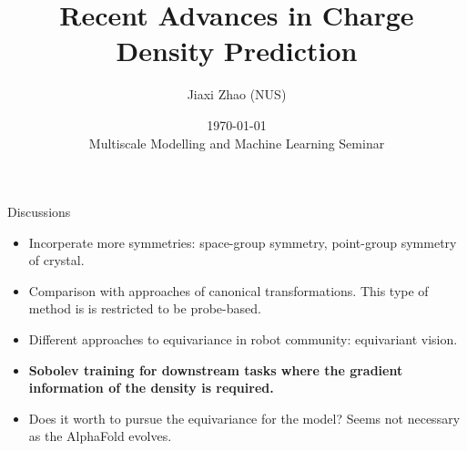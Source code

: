 \documentclass[aspectratio=169]{beamer}
\title{Recent Advances in Charge Density Prediction}
\author{Jiaxi Zhao (NUS)}
\date{\today \\
Multiscale Modelling and Machine Learning Seminar}
\begin{document}




% 

      
\begin{frame}{Discussions}
    \begin{itemize}
        \item Incorperate more symmetries: space-group symmetry, point-group symmetry of crystal.
        \item Comparison with approaches of canonical transformations. This type of method is
        is restricted to be probe-based.
        \item Different approaches to equivariance in robot community: equivariant vision.
        \item {\color{red} \textbf{Sobolev training for downstream tasks where the gradient information of the density
        is required.}}
        \item Does it worth to pursue the equivariance for the model? Seems not necessary as
        the AlphaFold evolves.
    \end{itemize}
\end{frame}
\end{document}

